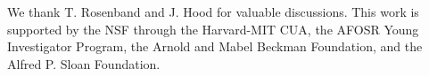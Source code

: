 \documentclass[aps,prl,twocolumn,groupedaddress]{revtex4-1}
\begin{document}
We thank T. Rosenband and J. Hood for valuable discussions.
This work is supported by the NSF through the Harvard-MIT CUA,
the AFOSR Young Investigator Program, the Arnold and Mabel Beckman Foundation,
and the Alfred P. Sloan Foundation.



\end{document}
